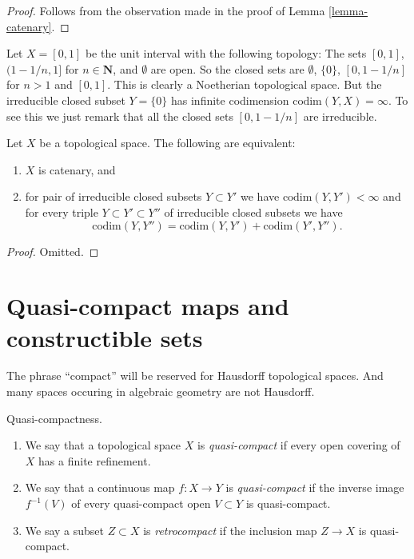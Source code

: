\begin{proof}
Follows from the observation made in the proof of
Lemma \ref{lemma-catenary}.
\end{proof}

\begin{example}
\label{example-Noetherian-infinite-codimension}
Let $X = [0, 1]$ be the unit interval with the following
topology: The sets $[0, 1]$, $(1 - 1/n, 1]$ for $n \in \mathbf{N}$, and
$\emptyset$ are open. So the closed sets are
$\emptyset$, $\{0\}$, $[0, 1 - 1/n]$ for $n > 1$ and $[0, 1]$.
This is clearly a Noetherian topological space.
But the irreducible closed subset $Y = \{0\}$ has infinite
codimension $\text{codim}(Y, X) = \infty$.
To see this we just remark that all the closed sets
$[0, 1 - 1/n]$ are irreducible.
\end{example}

\begin{lemma}
\label{lemma-catenary-in-codimension}
Let $X$ be a topological space. The following are equivalent:
\begin{enumerate}
\item $X$ is catenary, and
\item for pair of irreducible closed subsets $Y \subset Y'$ we have
$\text{codim}(Y, Y') < \infty$ and for every triple
$Y \subset Y' \subset Y''$ of irreducible closed subsets we have
$$
\text{codim}(Y, Y'') = \text{codim}(Y, Y') + \text{codim}(Y', Y'').
$$
\end{enumerate}
\end{lemma}

\begin{proof}
Omitted.
\end{proof}







\section{Quasi-compact maps and constructible sets}
\label{section-quasi-compact}

\noindent
The phrase ``compact'' will be reserved
for Hausdorff topological spaces. And many spaces occuring
in algebraic geometry are not Hausdorff.

\begin{definition}
\label{definition-quasi-compact}
Quasi-compactness.
\begin{enumerate}
\item We say that a topological space $X$ is {\it quasi-compact}
if every open covering of $X$ has a finite refinement.
\item We say that a continuous map $f : X \to Y$ is {\it quasi-compact}
if the inverse image $f^{-1}(V)$ of every quasi-compact open $V \subset Y$
is quasi-compact.
\item We say a subset $Z \subset X$ is {\it retrocompact}
if the inclusion map $Z \to X$ is quasi-compact.
\end{enumerate}
\end{definition}

